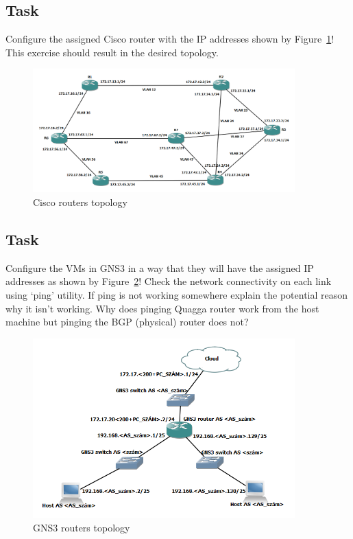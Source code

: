 \documentclass[a4paper]{article}
\begin{document}
\subsection{Task}
Configure the assigned Cisco router with the IP addresses shown by Figure~\ref{fig:cisco-topo}! This exercise should result in the desired topology.

\begin{figure}[H]
    \centering
    \includegraphics[width=0.9\textwidth]{figures/cisco_router_topology.png}
    \caption{Cisco routers topology}
    \label{fig:cisco-topo}
\end{figure}

\subsection{Task}

Configure the VMs in GNS3 in a way that they will have the assigned IP addresses as shown by Figure~\ref{fig:gns3-topo}! Check the network connectivity on each link using `ping' utility. If ping is not working somewhere explain the potential reason why it isn't working. Why does pinging Quagga router work from the host machine but pinging the BGP (physical) router does not?

\begin{figure}[H]
    \centering
    \includegraphics[width=0.9\textwidth]{figures/gns3_topology.png}
    \caption{GNS3 routers topology}
    \label{fig:gns3-topo}
\end{figure}
\end{document}
